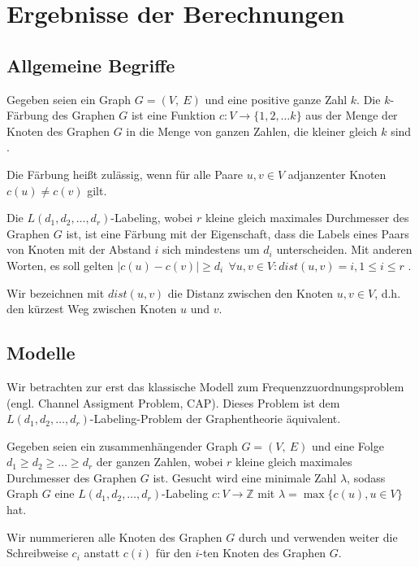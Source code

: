 \documentclass[
	fontsize=12pt,
	paper=a4,
	twoside=false,
	numbers=noenddot,
	plainheadsepline,
	toc=listof,
	toc=bibliography
]{scrartcl}
\begin{document}
\section*{Ergebnisse der Berechnungen}
\subsection*{Allgemeine Begriffe}

Gegeben seien ein Graph $G = (V,\ E)$ und eine positive ganze Zahl $k$. Die $k$-Färbung des Graphen $G$ ist eine Funktion $c:V\rightarrow\{1, 2, \dots k\}$ aus der Menge der Knoten des Graphen $G$ in die Menge von ganzen Zahlen, die kleiner gleich $k$ sind \citep[siehe][]{Harris}.

Die Färbung heißt zulässig, wenn für alle Paare $u,v\in V$ adjanzenter Knoten $c(u)\not=c(v)$ gilt.

Die $L(d_1, d_2, \dots, d_r)$-Labeling, wobei $r$ kleine gleich maximales Durchmesser des Graphen $G$ ist, ist eine Färbung mit der Eigenschaft, dass die Labels eines Paars von Knoten mit der Abstand $i$ sich mindestens um $d_i$ unterscheiden. Mit anderen Worten, es soll gelten $|c(u)-c(v)|\ge d_{i}\ \ \forall u,v\in V: dist(u,v)=i, 1\le i\le r$ \citep[vgl.][]{Bertossi}.

Wir bezeichnen mit $dist(u,v)$ die Distanz zwischen den Knoten $u,v\in V$, d.h. den kürzest Weg zwischen Knoten $u$ und $v$. 


\subsection*{Modelle}

Wir betrachten zur erst das klassische Modell zum Frequenzzuordnungsproblem (engl. Channel Assigment Problem, CAP). Dieses Problem ist dem $L(d_1, d_2, \dots, d_r)$-Labeling-Problem der Graphentheorie äquivalent.

Gegeben seien ein zusammenhängender Graph $G=(V,\ E)$ und eine Folge $d_1\ge d_2\ge\dots\ge d_r$ der ganzen Zahlen, wobei $r$ kleine gleich maximales Durchmesser des Graphen $G$ ist. Gesucht wird eine minimale Zahl $\lambda$, sodass Graph $G$ eine $L(d_1, d_2, \dots, d_r)$-Labeling $c:V\rightarrow\mathbb{Z}$ mit $\lambda = \max\{c(u), u\in V\}$ hat.

Wir nummerieren alle Knoten des Graphen $G$ durch und verwenden weiter die Schreibweise $c_i$ anstatt $c(i)$ für den $i$-ten Knoten des Graphen $G$.
\end{document}
